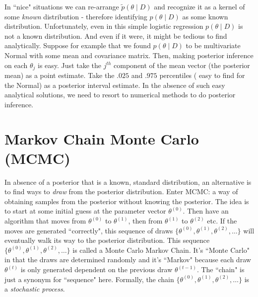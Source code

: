 \documentclass[twoside]{article}
\begin{document}
In ``nice" situations we can re-arrange $\tilde p(\theta \mid D)$ and recognize it as a kernel of some \textit{known} distribution - therefore identifying $p(\theta \mid D)$ as some known distribution. Unfortunately, even in this simple logistic regression $p(\theta \mid D)$ is not a known distribution. And even if it were, it might be tedious to find analytically. Suppose for example that we found $p(\theta \mid D)$ to be multivariate Normal with some mean and covariance matrix. Then, making posterior inference on each $\theta_j$ is easy. Just take the $j^{th}$ component of the mean vector (the posterior mean) as a point estimate. Take the $.025$ and $.975$ percentiles ( easy to find for the Normal) as a posterior interval estimate. In the absence of such easy analytical solutions, we need to resort to numerical methods to do posterior inference.

\section{Markov Chain Monte Carlo (MCMC)}
In absence of a posterior that is a known, standard distribution, an alternative is to find ways to \textit{draw} from the posterior distribution. Enter MCMC: a way of obtaining samples from the posterior without knowing the posterior. The idea is to start at some initial guess at the parameter vector $\theta^{(0)}$. Then have an algorithm that moves from $\theta^{(0)}$ to $\theta^{(1)}$, then from $\theta^{(1)}$ to $\theta^{(2)}$ etc. If the moves are generated ``correctly", this sequence of draws $\{ \theta^{(0)}, \theta^{(1)}, \theta^{(2)}, \dots \}$ will eventually walk its way to the posterior distribution. This sequence $\{ \theta^{(0)}, \theta^{(1)}, \theta^{(2)}, \dots \}$ is called a Monte Carlo Markov Chain. It's ``Monte Carlo" in that the draws are determined randomly and it's ``Markov" because each draw $\theta^{(t)}$ is only generated dependent on the previous draw $\theta^{(t-1)}$. The ``chain" is just a synonym for ``sequence" here. Formally, the chain $\{ \theta^{(0)}, \theta^{(1)}, \theta^{(2)}, \dots \}$ is a \textit{stochastic process}.
\end{document}
